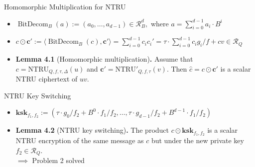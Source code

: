 \documentclass[aspectratio=169]{beamer}
\begin{document}
\begin{frame}{Homomorphic Multiplication for NTRU}
    \begin{itemize}
        \item $\operatorname{BitDecom}_B(a) := (a_0, \ldots, a_{d-1}) \in \mathcal{R}_B^d,$ where $a = \sum_{i=0}^{d-1}a_i\cdot B^i$
    \end{itemize}
    \begin{itemize}
        \item $c \odot \mathbf{c}' := \langle \operatorname{BitDecom}_B(c), \mathbf{c}' \rangle = \sum_{i=0}^{d-1}c_ic_i'=\tau \cdot \sum_{i=0}^{d-1} c_i g_i / f + cv \in \mathcal{R}_Q$
    \end{itemize}
    \begin{itemize}
        \item \textbf{Lemma 4.1} (Homomorphic multiplication)\textbf{.} Assume that $c = \mathrm{NTRU}_{Q, f, \tau, \Delta}(u)$ and $\mathbf{c}' = \mathrm{NTRU}'_{Q, f, \tau}(v) $. Then $\hat{c} = c \odot \mathbf{c}'$ is a scalar NTRU ciphertext of $uv$.
    \end{itemize}
\end{frame}

\begin{frame}{NTRU Key Switching}
    \begin{itemize}
        \item $\mathbf{ksk}_{f_1,f_2} := (\tau \cdot g_0/f_2 + B^0 \cdot f_1/f_2, \ldots, \tau \cdot g_{d-1}/f_2 + B^{d-1} \cdot f_1/f_2)$
    \end{itemize}

    \begin{itemize}
        \item \textbf{Lemma 4.2} (NTRU key switching)\textbf{.} The product $c \odot \mathbf{ksk}_{f_1,f_2}$ is a scalar NTRU encryption of the same message as $c$ but under the new private key $f_2 \in \mathcal{R}_Q$.
        \\ $\implies$ Problem 2 solved
    \end{itemize}    
\end{frame}
\end{document}
